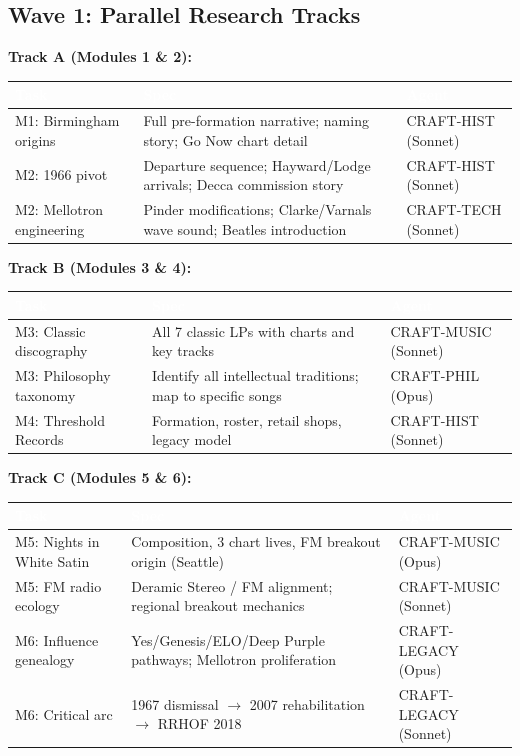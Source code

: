 \documentclass[11pt,letterpaper]{article}
\newcommand{\tableheader}[1]{\textbf{\sffamily\textcolor{white}{#1}}}
\begin{document}
\subsection{Wave 1: Parallel Research Tracks}

\textbf{Track A (Modules 1 \& 2):}

\begin{center}
\begin{tabularx}{\textwidth}{L{3cm}XC{2.5cm}}
\toprule
{}
\tableheader{Task} & \tableheader{Spec} & \tableheader{Agent} \\
\midrule
M1: Birmingham origins & Full pre-formation narrative; naming story; Go Now chart detail & CRAFT-HIST (Sonnet) \\
M2: 1966 pivot & Departure sequence; Hayward/Lodge arrivals; Decca commission story & CRAFT-HIST (Sonnet) \\
M2: Mellotron engineering & Pinder modifications; Clarke/Varnals wave sound; Beatles introduction & CRAFT-TECH (Sonnet) \\
\bottomrule
\end{tabularx}
\end{center}

\textbf{Track B (Modules 3 \& 4):}

\begin{center}
\begin{tabularx}{\textwidth}{L{3cm}XC{2.5cm}}
\toprule
{}
\tableheader{Task} & \tableheader{Spec} & \tableheader{Agent} \\
\midrule
M3: Classic discography & All 7 classic LPs with charts and key tracks & CRAFT-MUSIC (Sonnet) \\
M3: Philosophy taxonomy & Identify all intellectual traditions; map to specific songs & CRAFT-PHIL (Opus) \\
M4: Threshold Records & Formation, roster, retail shops, legacy model & CRAFT-HIST (Sonnet) \\
\bottomrule
\end{tabularx}
\end{center}

\textbf{Track C (Modules 5 \& 6):}

\begin{center}
\begin{tabularx}{\textwidth}{L{3cm}XC{2.5cm}}
\toprule
{}
\tableheader{Task} & \tableheader{Spec} & \tableheader{Agent} \\
\midrule
M5: Nights in White Satin & Composition, 3 chart lives, FM breakout origin (Seattle) & CRAFT-MUSIC (Opus) \\
M5: FM radio ecology & Deramic Stereo / FM alignment; regional breakout mechanics & CRAFT-MUSIC (Sonnet) \\
M6: Influence genealogy & Yes/Genesis/ELO/Deep Purple pathways; Mellotron proliferation & CRAFT-LEGACY (Opus) \\
M6: Critical arc & 1967 dismissal $\rightarrow$ 2007 rehabilitation $\rightarrow$ RRHOF 2018 & CRAFT-LEGACY (Sonnet) \\
\bottomrule
\end{tabularx}
\end{center}
\end{document}
